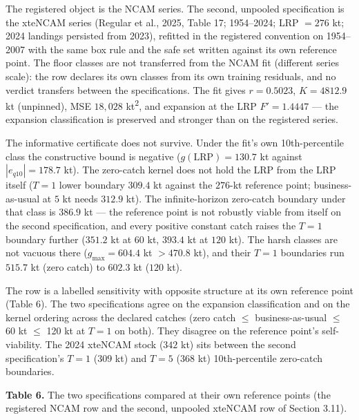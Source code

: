 \documentclass[11pt]{article}
\begin{document}
The registered object is the NCAM series. The second, unpooled
specification is the xteNCAM series (Regular et al., 2025, Table 17;
1954--2024; LRP \(= 276\) kt; 2024 landings persisted from 2023),
refitted in the registered convention on 1954--2007 with the same box
rule and the safe set written against its own reference point. The floor
classes are not transferred from the NCAM fit (different series scale):
the row declares its own classes from its own training residuals, and no
verdict transfers between the specifications. The fit gives
\(r = 0.5023\), \(K = 4812.9\) kt (unpinned), MSE \(18{,}028\) kt\textsuperscript{2}, and
expansion at the LRP \(F' = 1.4447\) --- the expansion classification is
preserved and stronger than on the registered series.

The informative certificate does not survive. Under the fit's own
10th-percentile class the constructive bound is negative
(\(g(\mathrm{LRP}) = 130.7\) kt against \(|e_{q10}| = 178.7\) kt). The
zero-catch kernel does not hold the LRP from the LRP itself (\(T=1\)
lower boundary \(309.4\) kt against the \(276\)-kt reference point;
business-as-usual at \(5\) kt needs \(312.9\) kt). The infinite-horizon
zero-catch boundary under that class is \(386.9\) kt --- the reference
point is not robustly viable from itself on the second specification,
and every positive constant catch raises the \(T=1\) boundary further
(\(351.2\) kt at \(60\) kt, \(393.4\) kt at \(120\) kt). The harsh
classes are not vacuous there (\(g_{\max} = 604.4\) kt \(> 470.8\) kt),
and their \(T=1\) boundaries run \(515.7\) kt (zero catch) to \(602.3\)
kt (\(120\) kt).

The row is a labelled sensitivity with opposite structure at its own
reference point (Table 6). The two specifications agree on the expansion
classification and on the kernel ordering across the declared catches
(zero catch \ensuremath{\leq} business-as-usual \ensuremath{\leq} 60 kt \ensuremath{\leq} 120 kt at \(T=1\) on both).
They disagree on the reference point's self-viability. The 2024 xteNCAM
stock (\(342\) kt) sits between the second specification's \(T=1\)
(\(309\) kt) and \(T=5\) (\(368\) kt) 10th-percentile zero-catch
boundaries.

\textbf{Table 6.} The two specifications compared at their own reference
points (the registered NCAM row and the second, unpooled xteNCAM row of
Section 3.11).
\end{document}
